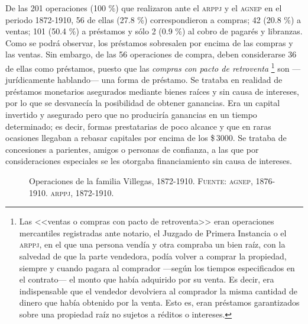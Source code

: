 \documentclass[14pt,twoside,final]{extbook} %
\let\oldfootnote\footnote
\renewcommand\footnote[1]{%
\oldfootnote{\hspace{1mm}#1}}
\begin{document}
De las 201 operaciones (100 \%) que realizaron ante el \textsc{arppj} y el \textsc{agnep} en el periodo 1872-1910, 56 de ellas (27.8 \%) correspondieron a compras; 42 (20.8 \%) a ventas; 101 (50.4 \%) a préstamos y sólo 2 (0.9 \%) al cobro de pagarés y libranzas. Como se podrá observar, los préstamos sobresalen por encima de las compras y las ventas. Sin embargo, de las 56 operaciones de compra, deben considerarse 36 de ellas como préstamos, puesto que las \emph{compras con pacto de retroventa}\footnote{Las <<ventas o compras con pacto de retroventa>> eran operaciones mercantiles registradas ante notario, el Juzgado de Primera Instancia o el \textsc{arppj}, en el que una persona vendía y otra compraba un bien raíz, con la salvedad de que la parte vendedora, podía volver a comprar la propiedad, siempre y cuando pagara al comprador ---según los tiempos especificados en el contrato--- el monto que había adquirido por su venta. Es decir, era indispensable que el vendedor devolviera al comprador la misma cantidad de dinero que había obtenido por la venta. Esto es, eran préstamos garantizados sobre una propiedad raíz no sujetos a réditos o intereses.} son ---jurídicamente hablando--- una forma de préstamo. Se trataba en realidad de préstamos monetarios asegurados mediante bienes raíces y sin causa de intereses, por lo que se desvanecía la posibilidad de obtener ganancias. Era un capital invertido y asegurado pero que no produciría ganancias en un tiempo determinado; es decir, formas prestatarias de poco alcance y que en raras ocasiones llegaban a rebasar capitales por encima de los \$\,3000. Se trataba de concesiones a parientes, amigos o personas de confianza, a las que por consideraciones especiales se les otorgaba financiamiento sin causa de intereses.
\begin{figure}
\centering
{}
\caption[Operaciones de la familia Villegas, 1872-1910]{Operaciones de la familia Villegas, 1872-1910. \textsc{Fuente:} \textsc{agnep}, 1876-1910. \textsc{arppj}, 1872-1910.}
\label{fig:operaciones-villegas}
\end{figure}
\end{document}
